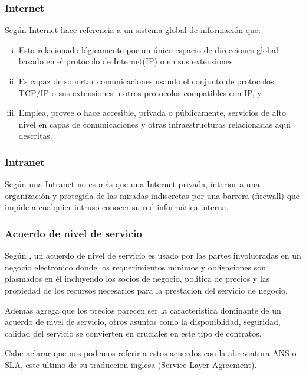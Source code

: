 \subsubsection{Internet}
Seg\'un \cite{fnc} Internet hace referencia a un sistema global de informaci\'on que:
\begin{enumerate}[i.]
    \item Esta relacionado l\'ogicamente por un \'unico espacio de direcciones
          global basado en el protocolo de Internet(IP) o en sus extensiones
    \item Es capaz de soportar comunicaciones usando el conjunto de protocolos TCP/IP
          o sus extensiones u otros protocolos compatibles con IP, y
    \item Emplea, provee o hace accesible, privada o p\'ublicamente, servicios de
          alto nivel en capas de comunicaciones y otras infraestructuras relacionadas
          aqui descritas.
\end{enumerate}
\subsubsection{Intranet}
Seg\'un \cite{lafrance} una Intranet no es m\'as que una Internet privada, interior a una
organizaci\'on y protegida de las miradas indiscretas por una barrera (firewall) que
impide a cualquier intruso conocer su red inform\'atica interna.
\subsubsection{Acuerdo de nivel de servicio}
Seg\'un \cite{qianq}, un acuerdo de nivel de servicio es usado por las partes
involucradas en un negocio electronico donde los requerimientos minimos y obligaciones son
plasmados en \'el incluyendo los socios de negocio, politica de precios y las propiedad
de los recursos necesarios para la prestacion del servicio de negocio.

Adem\'as \cite{qianq} agrega que los precios parecen ser la caracteristica dominante
de un acuerdo de nivel de servicio, otros asuntos como la disponiblidad, seguridad,
calidad del servicio se convierten en cruciales en este tipo de contratos.

Cabe aclarar que nos podemos referir a estos acuerdos con la abreviatura ANS o SLA,
este ultimo de su traduccion inglesa (Service Layer Agreement).

